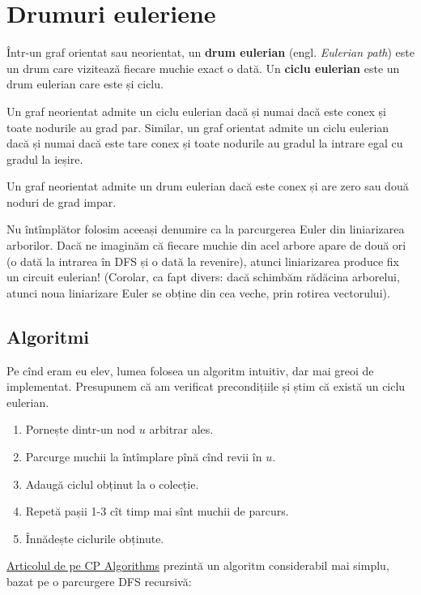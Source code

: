 \documentclass[../main.tex]{subfiles}
\begin{document}
\chapter{Drumuri euleriene}

Într-un graf orientat sau neorientat, un \textbf{drum eulerian} (engl. \textit{Eulerian path}) este un drum care vizitează fiecare muchie exact o dată. Un \textbf{ciclu eulerian} este un drum eulerian care este și ciclu.

Un graf neorientat admite un ciclu eulerian dacă și numai dacă este conex și toate nodurile au grad par. Similar, un graf orientat admite un ciclu eulerian dacă și numai dacă este tare conex și toate nodurile au gradul la intrare egal cu gradul la ieșire.

Un graf neorientat admite un drum eulerian dacă este conex și are zero sau două noduri de grad impar.

Nu întîmplător folosim aceeași denumire ca la parcurgerea Euler din liniarizarea arborilor. Dacă ne imaginăm că fiecare muchie din acel arbore apare de două ori (o dată la intrarea în DFS și o dată la revenire), atunci liniarizarea produce fix un circuit eulerian! (Corolar, ca fapt divers: dacă schimbăm rădăcina arborelui, atunci noua liniarizare Euler se obține din cea veche, prin rotirea vectorului).

\section{Algoritmi}

Pe cînd eram eu elev, lumea folosea un algoritm intuitiv, dar mai greoi de implementat. Presupunem că am verificat precondițiile și știm că există un ciclu eulerian.

\begin{enumerate}
  \item Pornește dintr-un nod $u$ arbitrar ales.
  \item Parcurge muchii la întîmplare pînă cînd revii în $u$.
  \item Adaugă ciclul obținut la o colecție.
  \item Repetă pașii 1-3 cît timp mai sînt muchii de parcurs.
  \item Înnădește ciclurile obținute.
\end{enumerate}

\href{https://cp-algorithms.com/graph/euler_path.html}{Articolul de pe CP Algorithms} prezintă un algoritm considerabil mai simplu, bazat pe o parcurgere DFS recursivă:
\end{document}
